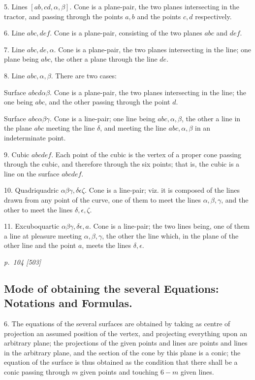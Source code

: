\documentclass[11pt,a4paper]{article}
\newcommand{\sourcepage}[2]{%
  \bigskip
  \noindent\textit{p.~#1 [#2]}%
  \par\smallskip
}
\begin{document}
5\textdegree. Lines $[ab,cd,\alpha,\beta]$. Cone is a plane-pair, the two planes
intersecting in the tractor, and passing through the points $a,b$ and the points
$c,d$ respectively.

6\textdegree. Line $abc,def$. Cone is a plane-pair, consisting of the two planes
$abc$ and $def$.

7\textdegree. Line $abc,de,\alpha$. Cone is a plane-pair, the two planes intersecting
in the line; one plane being $abc$, the other a plane through the line $de$.

8\textdegree. Line $abc,\alpha,\beta$. There are two cases:

Surface $abcd\alpha\beta$. Cone is a plane-pair, the two planes intersecting in
the line; the one being $abc$, and the other passing through the point $d$.

Surface $abc\alpha\beta\gamma$. Cone is a line-pair; one line being
$abc,\alpha,\beta$, the other a line in the plane $abc$ meeting the line $\delta$,
and meeting the line $abc,\alpha,\beta$ in an indeterminate point.

9\textdegree. Cubic $abcdef$. Each point of the cubic is the vertex of a proper
cone passing through the cubic, and therefore through the six points; that is, the
cubic is a line on the surface $abcdef$.

10\textdegree. Quadriquadric $\alpha\beta\gamma,\delta\epsilon\zeta$. Cone is a
line-pair; viz. it is composed of the lines drawn from any point of the curve, one
of them to meet the lines $\alpha,\beta,\gamma$, and the other to meet the lines
$\delta,\epsilon,\zeta$.

11\textdegree. Excuboquartic $\alpha\beta\gamma,\delta\epsilon,a$. Cone is a
line-pair; the two lines being, one of them a line at pleasure meeting
$\alpha,\beta,\gamma$, the other the line which, in the plane of the other line and
the point $a$, meets the lines $\delta,\epsilon$.

\sourcepage{104}{503}
\subsection*{Mode of obtaining the several Equations: Notations and Formulas.}

6. The equations of the several surfaces are obtained by taking as centre of projection
an assumed position of the vertex, and projecting everything upon an arbitrary plane;
the projections of the given points and lines are points and lines in the arbitrary
plane, and the section of the cone by this plane is a conic; the equation of the
surface is thus obtained as the condition that there shall be a conic passing through
$m$ given points and touching $6-m$ given lines.
\end{document}
